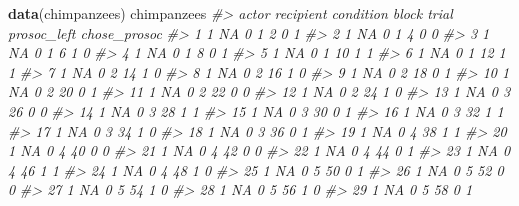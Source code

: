 \documentclass[]{book}
\newenvironment{Shaded}{\begin{snugshade}}{\end{snugshade}}
\newcommand{\KeywordTok}[1]{\textcolor[rgb]{0.13,0.29,0.53}{\textbf{#1}}}
\newcommand{\CommentTok}[1]{\textcolor[rgb]{0.56,0.35,0.01}{\textit{#1}}}
\newcommand{\NormalTok}[1]{#1}
\begin{document}
\begin{Shaded}
\begin{Highlighting}[]
\KeywordTok{data}\NormalTok{(chimpanzees)}
\NormalTok{chimpanzees}
\CommentTok{#>     actor recipient condition block trial prosoc_left chose_prosoc}
\CommentTok{#> 1       1        NA         0     1     2           0            1}
\CommentTok{#> 2       1        NA         0     1     4           0            0}
\CommentTok{#> 3       1        NA         0     1     6           1            0}
\CommentTok{#> 4       1        NA         0     1     8           0            1}
\CommentTok{#> 5       1        NA         0     1    10           1            1}
\CommentTok{#> 6       1        NA         0     1    12           1            1}
\CommentTok{#> 7       1        NA         0     2    14           1            0}
\CommentTok{#> 8       1        NA         0     2    16           1            0}
\CommentTok{#> 9       1        NA         0     2    18           0            1}
\CommentTok{#> 10      1        NA         0     2    20           0            1}
\CommentTok{#> 11      1        NA         0     2    22           0            0}
\CommentTok{#> 12      1        NA         0     2    24           1            0}
\CommentTok{#> 13      1        NA         0     3    26           0            0}
\CommentTok{#> 14      1        NA         0     3    28           1            1}
\CommentTok{#> 15      1        NA         0     3    30           0            1}
\CommentTok{#> 16      1        NA         0     3    32           1            1}
\CommentTok{#> 17      1        NA         0     3    34           1            0}
\CommentTok{#> 18      1        NA         0     3    36           0            1}
\CommentTok{#> 19      1        NA         0     4    38           1            1}
\CommentTok{#> 20      1        NA         0     4    40           0            0}
\CommentTok{#> 21      1        NA         0     4    42           0            0}
\CommentTok{#> 22      1        NA         0     4    44           0            1}
\CommentTok{#> 23      1        NA         0     4    46           1            1}
\CommentTok{#> 24      1        NA         0     4    48           1            0}
\CommentTok{#> 25      1        NA         0     5    50           0            1}
\CommentTok{#> 26      1        NA         0     5    52           0            0}
\CommentTok{#> 27      1        NA         0     5    54           1            0}
\CommentTok{#> 28      1        NA         0     5    56           1            0}
\CommentTok{#> 29      1        NA         0     5    58           0            1}

\end{Highlighting}
\end{Shaded}
\end{document}
